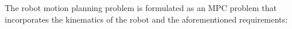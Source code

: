 \documentclass[letterpaper, 10 pt, conference]{ieeeconf}
\begin{document}
The robot motion planning problem is formulated as an MPC problem that incorporates the kinematics of the robot and the aforementioned requirements:
\end{document}
